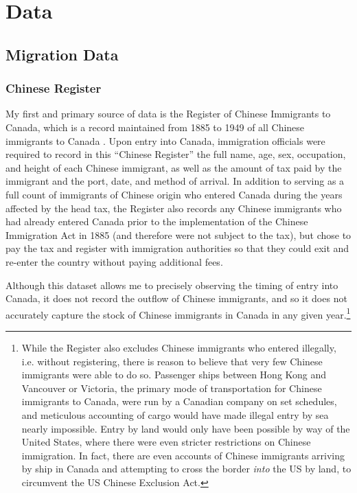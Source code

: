 \section{Data}
\subsection{Migration Data}
\subsubsection{Chinese Register}
My first and primary source of data is the Register of Chinese Immigrants to Canada, which is a record maintained from 1885 to 1949 of all Chinese immigrants to Canada \citep{chineseregister}. Upon entry into Canada, immigration officials were required to record in this ``Chinese Register'' the full name, age, sex, occupation, and height of each Chinese immigrant, as well as the amount of tax paid by the immigrant and the port, date, and method of arrival.
In addition to serving as a full count of immigrants of Chinese origin who entered Canada during the years affected by the head tax,
the Register also records any Chinese immigrants who had already entered Canada prior to the implementation of the Chinese Immigration Act in 1885 (and therefore were not subject to the tax),
but chose to pay the tax and register with immigration authorities so that they could exit and re-enter the country without paying additional fees.

Although this dataset allows me to precisely observing the timing of entry into Canada, it does not record the outflow of Chinese immigrants, and so it does not accurately capture the stock of Chinese immigrants in Canada in any given year.\footnote{While the Register also excludes Chinese immigrants who entered illegally, i.e. without registering, there is reason to believe that very few Chinese immigrants were able to do so. Passenger ships between Hong Kong and Vancouver or Victoria, the primary mode of transportation for Chinese immigrants to Canada, were run by a Canadian company on set schedules, and meticulous accounting of cargo would have made illegal entry by sea nearly impossible. 
Entry by land would only have been possible by way of the United States, where there were even stricter restrictions on Chinese immigration. In fact, there are even accounts of Chinese immigrants arriving by ship in Canada and attempting to cross the border \textit{into} the US by land, to circumvent the US Chinese Exclusion Act.}

